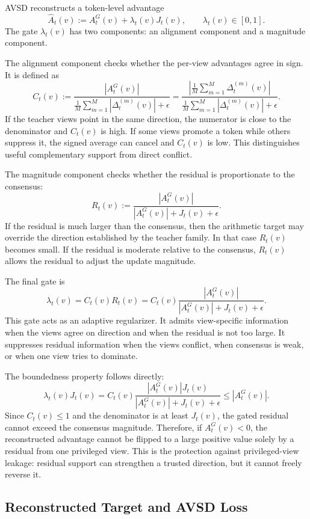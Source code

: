 AVSD reconstructs a token-level advantage
\[
    \widehat{A}_t(v)
    := A_t^G(v)+\lambda_t(v)J_t(v),
    \qquad \lambda_t(v)\in[0,1].
\]
The gate $\lambda_t(v)$ has two components: an alignment component and a magnitude component.

The alignment component checks whether the per-view advantages agree in sign. It is defined as
\[
    C_t(v)
    :=
    \frac{|A_t^G(v)|}
    {\frac{1}{M}\sum_{m=1}^{M}|\Delta_t^{(m)}(v)|+\epsilon}
    =
    \frac{
    \left|\frac{1}{M}\sum_{m=1}^{M}\Delta_t^{(m)}(v)\right|}
    {\frac{1}{M}\sum_{m=1}^{M}|\Delta_t^{(m)}(v)|+\epsilon}.
\]
If the teacher views point in the same direction, the numerator is close to the denominator and $C_t(v)$ is high. If some views promote a token while others suppress it, the signed average can cancel and $C_t(v)$ is low. This distinguishes useful complementary support from direct conflict.

The magnitude component checks whether the residual is proportionate to the consensus:
\[
    R_t(v)
    :=
    \frac{|A_t^G(v)|}{|A_t^G(v)|+J_t(v)+\epsilon}.
\]
If the residual is much larger than the consensus, then the arithmetic target may override the direction established by the teacher family. In that case $R_t(v)$ becomes small. If the residual is moderate relative to the consensus, $R_t(v)$ allows the residual to adjust the update magnitude.

The final gate is
\[
    \lambda_t(v)
    =
    C_t(v)R_t(v)
    =
    C_t(v)
    \frac{|A_t^G(v)|}{|A_t^G(v)|+J_t(v)+\epsilon}.
    \label{eq:avsd-gate}
\]
This gate acts as an adaptive regularizer. It admits view-specific information when the views agree on direction and when the residual is not too large. It suppresses residual information when the views conflict, when consensus is weak, or when one view tries to dominate.

The boundedness property follows directly:
\[
    \lambda_t(v)J_t(v)
    =
    C_t(v)\frac{|A_t^G(v)|J_t(v)}
    {|A_t^G(v)|+J_t(v)+\epsilon}
    \leq |A_t^G(v)|.
\]
Since $C_t(v)\leq 1$ and the denominator is at least $J_t(v)$, the gated residual cannot exceed the consensus magnitude. Therefore, if $A_t^G(v)<0$, the reconstructed advantage cannot be flipped to a large positive value solely by a residual from one privileged view. This is the protection against privileged-view leakage: residual support can strengthen a trusted direction, but it cannot freely reverse it.

\subsection{Reconstructed Target and AVSD Loss}

